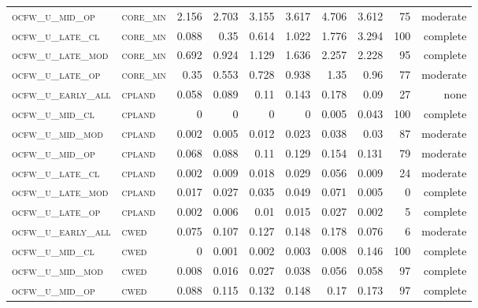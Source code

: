 \begin{landscape}
\begin{center}
\begin{footnotesize}
\begin{longtable}{llrrrrr|rrr}
\textsc{ocfw\_u\_mid\_op   } & \textsc{core\_mn  }    & 2.156    & 2.703    & 3.155    & 3.617    & 4.706    & 3.612    & 75  & moderate \\
\textsc{ocfw\_u\_late\_cl  } & \textsc{core\_mn  }    & 0.088    & 0.35     & 0.614    & 1.022    & 1.776    & 3.294    & 100 & complete \\
\textsc{ocfw\_u\_late\_mod } & \textsc{core\_mn  }    & 0.692    & 0.924    & 1.129    & 1.636    & 2.257    & 2.228    & 95  & complete \\
\textsc{ocfw\_u\_late\_op  } & \textsc{core\_mn  }    & 0.35     & 0.553    & 0.728    & 0.938    & 1.35     & 0.96     & 77  & moderate \\
\textsc{ocfw\_u\_early\_all} & \textsc{cpland    }    & 0.058    & 0.089    & 0.11     & 0.143    & 0.178    & 0.09     & 27  & none     \\
\textsc{ocfw\_u\_mid\_cl   } & \textsc{cpland    }    & 0        & 0        & 0        & 0        & 0.005    & 0.043    & 100 & complete \\
\textsc{ocfw\_u\_mid\_mod  } & \textsc{cpland    }    & 0.002    & 0.005    & 0.012    & 0.023    & 0.038    & 0.03     & 87  & moderate \\
\textsc{ocfw\_u\_mid\_op   } & \textsc{cpland    }    & 0.068    & 0.088    & 0.11     & 0.129    & 0.154    & 0.131    & 79  & moderate \\
\textsc{ocfw\_u\_late\_cl  } & \textsc{cpland    }    & 0.002    & 0.009    & 0.018    & 0.029    & 0.056    & 0.009    & 24  & moderate \\
\textsc{ocfw\_u\_late\_mod } & \textsc{cpland    }    & 0.017    & 0.027    & 0.035    & 0.049    & 0.071    & 0.005    & 0   & complete \\
\textsc{ocfw\_u\_late\_op  } & \textsc{cpland    }    & 0.002    & 0.006    & 0.01     & 0.015    & 0.027    & 0.002    & 5   & complete \\
\textsc{ocfw\_u\_early\_all} & \textsc{cwed      }    & 0.075    & 0.107    & 0.127    & 0.148    & 0.178    & 0.076    & 6   & moderate \\
\textsc{ocfw\_u\_mid\_cl   } & \textsc{cwed      }    & 0        & 0.001    & 0.002    & 0.003    & 0.008    & 0.146    & 100 & complete \\
\textsc{ocfw\_u\_mid\_mod  } & \textsc{cwed      }    & 0.008    & 0.016    & 0.027    & 0.038    & 0.056    & 0.058    & 97  & complete \\
\textsc{ocfw\_u\_mid\_op   } & \textsc{cwed      }    & 0.088    & 0.115    & 0.132    & 0.148    & 0.17     & 0.173    & 97  & complete \\

\end{longtable}
\end{footnotesize}
\end{center}
\end{landscape}
